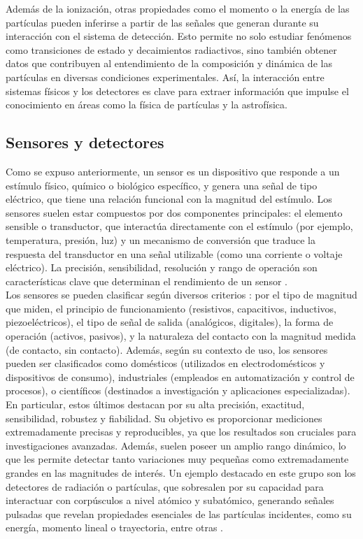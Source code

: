 \documentclass{report}
\begin{document}
\noindent Además de la ionización, otras propiedades como el momento o la energía de las partículas pueden inferirse a partir de las señales que generan durante su interacción con el sistema de detección. Esto permite no solo estudiar fenómenos como transiciones de estado y decaimientos radiactivos, sino también obtener datos que contribuyen al entendimiento de la composición y dinámica de las partículas en diversas condiciones experimentales. Así, la interacción entre sistemas físicos y los detectores es clave para extraer información que impulse el conocimiento en áreas como la física de partículas y la astrofísica.

\subsection{Sensores y detectores}

\noindent Como se expuso anteriormente, un sensor es un dispositivo que responde a un estímulo físico, químico o biológico específico, y genera una señal de tipo eléctrico, que tiene una relación funcional con la magnitud del estímulo. Los sensores suelen estar compuestos por dos componentes principales: el elemento sensible o transductor, que interactúa directamente con el estímulo (por ejemplo, temperatura, presión, luz) y un mecanismo de conversión que traduce la respuesta del transductor en una señal utilizable (como una corriente o voltaje eléctrico). La precisión, sensibilidad, resolución y rango de operación son características clave que determinan el rendimiento de un sensor \cite{webster1}.\\

\noindent Los sensores se pueden clasificar según diversos criterios \cite{sinclair3}: por el tipo de magnitud que miden, el principio de funcionamiento (resistivos, capacitivos, inductivos, piezoeléctricos), el tipo de señal de salida (analógicos, digitales), la forma de operación (activos, pasivos), y la naturaleza del contacto con la magnitud medida (de contacto, sin contacto). Además, según su contexto de uso, los sensores pueden ser clasificados como domésticos (utilizados en electrodomésticos y dispositivos de consumo), industriales (empleados en automatización y control de procesos), o científicos (destinados a investigación y aplicaciones especializadas).\\

\noindent En particular, estos últimos destacan por su alta precisión, exactitud, sensibilidad, robustez y fiabilidad. Su objetivo es proporcionar mediciones extremadamente precisas y reproducibles, ya que los resultados son cruciales para investigaciones avanzadas. Además, suelen poseer un amplio rango dinámico, lo que les permite detectar tanto variaciones muy pequeñas como extremadamente grandes en las magnitudes de interés. Un ejemplo destacado en este grupo son los detectores de radiación o partículas, que sobresalen por su capacidad para interactuar con corpúsculos a nivel atómico y subatómico, generando señales pulsadas que revelan propiedades esenciales de las partículas incidentes, como su energía, momento lineal o trayectoria, entre otras \cite{knoll2}.\\
\end{document}
